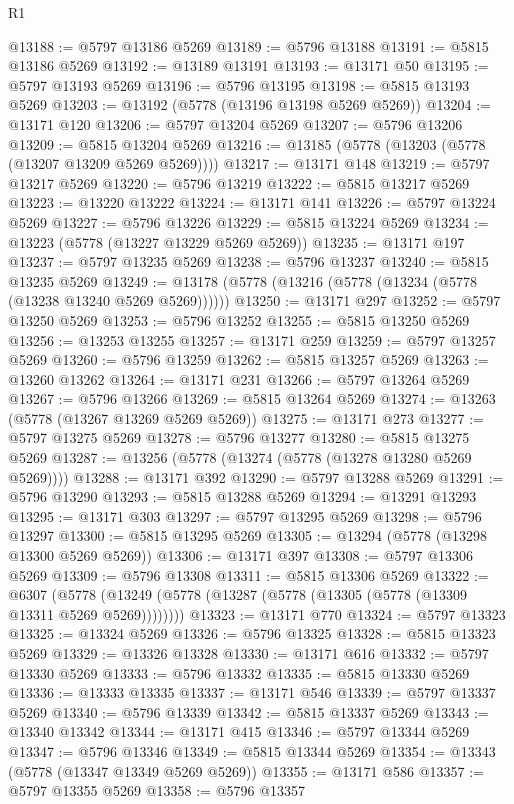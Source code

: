 \begin{lexlean}{R1}
\begin{coremodule}
@13188 := @5797 @13186 @5269
@13189 := @5796 @13188
@13191 := @5815 @13186 @5269
@13192 := @13189 @13191
@13193 := @13171 @50
@13195 := @5797 @13193 @5269
@13196 := @5796 @13195
@13198 := @5815 @13193 @5269
@13203 := @13192 (@5778 (@13196 @13198 @5269 @5269))
@13204 := @13171 @120
@13206 := @5797 @13204 @5269
@13207 := @5796 @13206
@13209 := @5815 @13204 @5269
@13216 := @13185 (@5778 (@13203 (@5778 (@13207 @13209 @5269 @5269))))
@13217 := @13171 @148
@13219 := @5797 @13217 @5269
@13220 := @5796 @13219
@13222 := @5815 @13217 @5269
@13223 := @13220 @13222
@13224 := @13171 @141
@13226 := @5797 @13224 @5269
@13227 := @5796 @13226
@13229 := @5815 @13224 @5269
@13234 := @13223 (@5778 (@13227 @13229 @5269 @5269))
@13235 := @13171 @197
@13237 := @5797 @13235 @5269
@13238 := @5796 @13237
@13240 := @5815 @13235 @5269
@13249 := @13178 (@5778 (@13216 (@5778 (@13234 (@5778 (@13238 @13240 @5269 @5269))))))
@13250 := @13171 @297
@13252 := @5797 @13250 @5269
@13253 := @5796 @13252
@13255 := @5815 @13250 @5269
@13256 := @13253 @13255
@13257 := @13171 @259
@13259 := @5797 @13257 @5269
@13260 := @5796 @13259
@13262 := @5815 @13257 @5269
@13263 := @13260 @13262
@13264 := @13171 @231
@13266 := @5797 @13264 @5269
@13267 := @5796 @13266
@13269 := @5815 @13264 @5269
@13274 := @13263 (@5778 (@13267 @13269 @5269 @5269))
@13275 := @13171 @273
@13277 := @5797 @13275 @5269
@13278 := @5796 @13277
@13280 := @5815 @13275 @5269
@13287 := @13256 (@5778 (@13274 (@5778 (@13278 @13280 @5269 @5269))))
@13288 := @13171 @392
@13290 := @5797 @13288 @5269
@13291 := @5796 @13290
@13293 := @5815 @13288 @5269
@13294 := @13291 @13293
@13295 := @13171 @303
@13297 := @5797 @13295 @5269
@13298 := @5796 @13297
@13300 := @5815 @13295 @5269
@13305 := @13294 (@5778 (@13298 @13300 @5269 @5269))
@13306 := @13171 @397
@13308 := @5797 @13306 @5269
@13309 := @5796 @13308
@13311 := @5815 @13306 @5269
@13322 := @6307
    (@5778 (@13249 (@5778 (@13287 (@5778 (@13305 (@5778 (@13309 @13311 @5269 @5269))))))))
@13323 := @13171 @770
@13324 := @5797 @13323
@13325 := @13324 @5269
@13326 := @5796 @13325
@13328 := @5815 @13323 @5269
@13329 := @13326 @13328
@13330 := @13171 @616
@13332 := @5797 @13330 @5269
@13333 := @5796 @13332
@13335 := @5815 @13330 @5269
@13336 := @13333 @13335
@13337 := @13171 @546
@13339 := @5797 @13337 @5269
@13340 := @5796 @13339
@13342 := @5815 @13337 @5269
@13343 := @13340 @13342
@13344 := @13171 @415
@13346 := @5797 @13344 @5269
@13347 := @5796 @13346
@13349 := @5815 @13344 @5269
@13354 := @13343 (@5778 (@13347 @13349 @5269 @5269))
@13355 := @13171 @586
@13357 := @5797 @13355 @5269
@13358 := @5796 @13357

\end{coremodule}
\end{lexlean}
